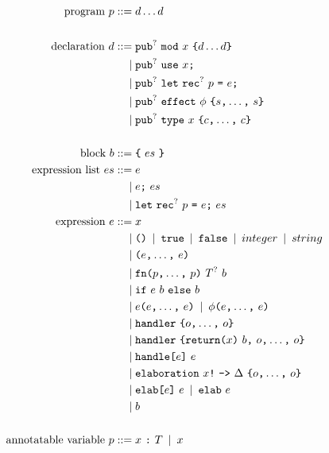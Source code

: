 \begin{figure}[p]
\begin{align*}
    \text{program}\ p
        \IS & d \dots d\\
    \\
    \text{declaration}\ d
        \IS & \opt{\tok{pub}}\ \tok{mod}\ x\ \tok{\{} \rep{d} \tok{\}}\\
        \OR & \opt{\tok{pub}}\ \tok{use}\ x\tok{;}\\
        \OR & \opt{\tok{pub}}\ \tok{let}\ \opt{\tok{rec}}\ p\ \tok{=}\ e\tok{;}\\
        \OR & \opt{\tok{pub}}\ \tok{effect}\ \phi\ \tok{\{} \csep{s} \tok{\}}\\
        \OR & \opt{\tok{pub}}\ \tok{type}\ x\ \tok{\{} \csep{c} \tok{\}}\\
    \\
    \text{block}\ b
        \IS & \tok{\{}\ es\ \tok{\}}\\
    \text{expression list}\ es
        \IS & e\\
        \OR & e\tok{;}\ es\\
        \OR & \tok{let}\ \opt{\tok{rec}}\ p\ \tok{=}\ e\tok{;}\ es\\
    \text{expression}\ e
        \IS & x\\
        \OR & \tok{()} \OR \tok{true} \OR \tok{false} \OR integer \OR string \\
        \OR & \tok{(} \csep{e} \tok{)} \\
        \OR & \tok{fn} \tok{(} \csep{p} \kw{)}\ \opt{T}\ b \\
        \OR & \tok{if}\ e\ b\ \tok{else}\ b\\
        \OR & e\tok{(} \csep{e} \tok{)} \OR \phi\tok{(} \csep{e} \tok{)} \\
        \OR & \tok{handler}\ \tok{\{} \csep{o} \tok{\}}\\
        \OR & \tok{handler}\ \tok{\{} \tok{return} \tok{(}x\tok{)}\ b \tok{,}\ \csep{o} \tok{\}}\\
        \OR & \tok{handle}\tok{[}e\tok{]}\ e \\
        \OR & \tok{elaboration}\ x\tok{!}\ \tok{->}\ \Delta\ \tok{\{} \csep{o} \tok{\}}\\
        \OR & \tok{elab}\tok{[} e \tok{]}\ e \OR \tok{elab}\ e \\
        \OR & b\\
    \\
    \text{annotatable variable}\ p
        \IS & x\ \tok{:}\ T \OR x\\

\end{align*}
\end{figure}
